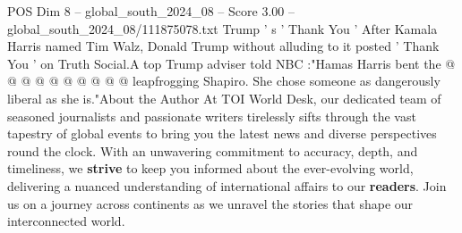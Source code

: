 \begin{textsample}{POS Dim 8 – global\_south\_2024\_08 – Score 3.00 – global\_south\_2024\_08/111875078.txt}
Trump ' s ' Thank You ' After Kamala Harris named Tim Walz, Donald Trump without alluding to it posted ' Thank You ' on Truth Social.A top Trump adviser told NBC :"Hamas Harris bent the @ @ @ @ @ @ @ @ @ @ leapfrogging Shapiro.
She chose someone as dangerously liberal as she is."About the Author At TOI World Desk, our dedicated team of seasoned journalists and passionate writers tirelessly sifts through the vast tapestry of global events to bring you the latest news and diverse perspectives round the clock.
With an unwavering commitment to accuracy, depth, and timeliness, we \textbf{strive} to keep you informed about the ever-evolving world, delivering a nuanced understanding of international affairs to our \textbf{readers}.
Join us on a journey across continents as we unravel the stories that shape our interconnected world.

\end{textsample}
